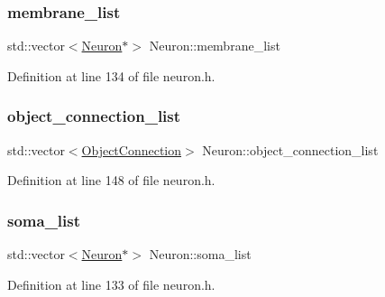 \subsubsection{\texorpdfstring{membrane\+\_\+list}{membrane\_list}}
{\footnotesize\ttfamily std\+::vector$<$\hyperlink{class_neuron}{Neuron}$\ast$$>$ Neuron\+::membrane\+\_\+list\hspace{0.3cm}{\ttfamily [protected]}}



Definition at line 134 of file neuron.\+h.

\mbox{\label{class_neuron_a8259952162df5c8bb66eb78126feafe6}} 
\subsubsection{\texorpdfstring{object\+\_\+connection\+\_\+list}{object\_connection\_list}}
{\footnotesize\ttfamily std\+::vector$<$\hyperlink{struct_neuron_1_1_object_connection}{Object\+Connection}$>$ Neuron\+::object\+\_\+connection\+\_\+list\hspace{0.3cm}{\ttfamily [protected]}}



Definition at line 148 of file neuron.\+h.

\mbox{\label{class_neuron_abb3745c6a8727f4ceb8db9e2258b90b5}} 
\subsubsection{\texorpdfstring{soma\+\_\+list}{soma\_list}}
{\footnotesize\ttfamily std\+::vector$<$\hyperlink{class_neuron}{Neuron}$\ast$$>$ Neuron\+::soma\+\_\+list\hspace{0.3cm}{\ttfamily [protected]}}



Definition at line 133 of file neuron.\+h.

\mbox{\label{class_neuron_a00b1e2e5f9d224759df1aa54093092ba}} 

